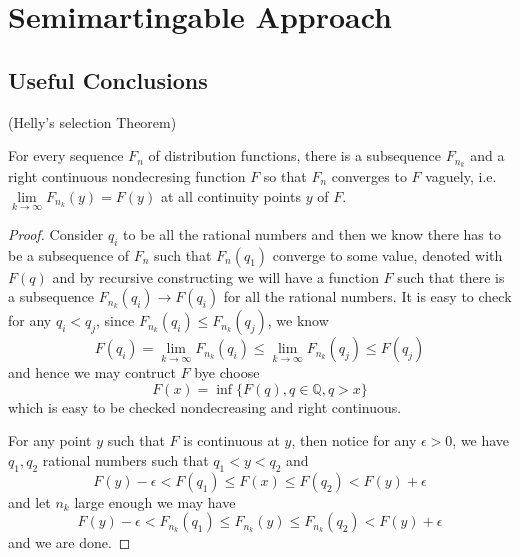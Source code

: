 \section{Semimartingable Approach}

\subsection{Useful Conclusions}

\begin{theorem}
    (Helly's selection Theorem)\par
    For every sequence $F_n$ of distribution functions, there is a subsequence $F_{n_k}$ and a right continuous nondecresing function $F$ so that $F_n$ converges to $F$ vaguely, i.e. $\lim\limits_{k\to\infty} F_{n_k}(y) = F(y)$ at all continuity points $y$ of $F$.
\end{theorem}
\begin{proof}
    Consider $q_i$ to be all the rational numbers and then we know there has to be a subsequence of $F_n$ such that $F_n(q_1)$ converge to some value, denoted with $F(q)$ and by recursive constructing we will have a function $F$ such that there is a subsequence $F_{n_k}(q_i) \to F(q_i)$ for all the rational numbers. It is easy to check for any $q_i < q_j$, since $F_{n_k}(q_i) \leq F_{n_k}(q_j)$, we know
    \[
    F(q_i) = \lim_{k\to\infty} F_{n_k}(q_i) \leq \lim_{k\to\infty} F_{n_k}(q_j) \leq F(q_j)
    \]
    and hence we may contruct $F$ bye choose
    \[F(x) = \inf\{F(q), q\in\mathbb{Q}, q>x\}\]
    which is easy to be checked nondecreasing and right continuous.\par
    For any point $y$ such that $F$ is continuous at $y$, then notice for any $\epsilon > 0$, we have $q_1,q_2$ rational numbers such that $q_1 < y <q_2$ and
    \[
    F(y)-\epsilon < F(q_1) \leq F(x) \leq F(q_2) < F(y)+\epsilon
    \] 
    and let $n_k$ large enough we may have
    \[
    F(y)-\epsilon < F_{n_k}(q_1) \leq F_{n_k}(y) \leq F_{n_k}(q_2) < F(y)+ \epsilon
    \]
    and we are done.
\end{proof}

